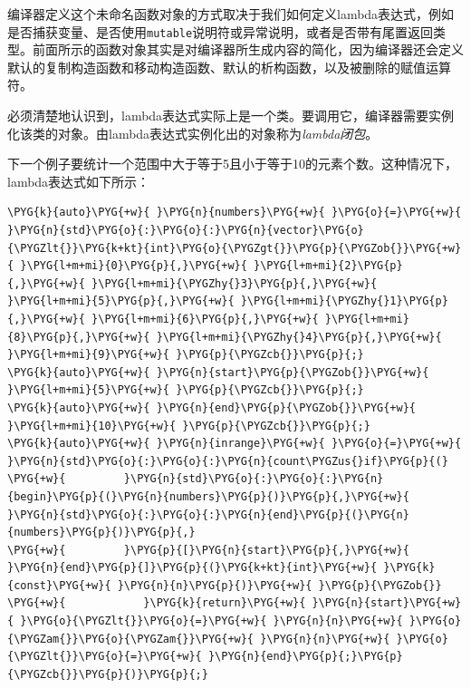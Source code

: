 
编译器定义这个未命名函数对象的方式取决于我们如何定义lambda表达式，例如是否捕获变量、是否使用\texttt{mutable}说明符或异常说明，或者是否带有尾置返回类型。前面所示的函数对象其实是对编译器所生成内容的简化，因为编译器还会定义默认的复制构造函数和移动构造函数、默认的析构函数，以及被删除的赋值运算符。



\begin{myNote}
必须清楚地认识到，lambda表达式实际上是一个类。要调用它，编译器需要实例化该类的对象。由lambda表达式实例化出的对象称为\textit{lambda闭包}。
\end{myNote}



下一个例子要统计一个范围中大于等于5且小于等于10的元素个数。这种情况下，lambda表达式如下所示：



\begin{codeblockbg}
\begin{Verbatim}[commandchars=\\\{\},breaklines=true,breakanywhere=true,fontsize=\codefont,xleftmargin=17bp]
\PYG{k}{auto}\PYG{+w}{ }\PYG{n}{numbers}\PYG{+w}{ }\PYG{o}{=}\PYG{+w}{ }\PYG{n}{std}\PYG{o}{:}\PYG{o}{:}\PYG{n}{vector}\PYG{o}{\PYGZlt{}}\PYG{k+kt}{int}\PYG{o}{\PYGZgt{}}\PYG{p}{\PYGZob{}}\PYG{+w}{ }\PYG{l+m+mi}{0}\PYG{p}{,}\PYG{+w}{ }\PYG{l+m+mi}{2}\PYG{p}{,}\PYG{+w}{ }\PYG{l+m+mi}{\PYGZhy{}3}\PYG{p}{,}\PYG{+w}{ }\PYG{l+m+mi}{5}\PYG{p}{,}\PYG{+w}{ }\PYG{l+m+mi}{\PYGZhy{}1}\PYG{p}{,}\PYG{+w}{ }\PYG{l+m+mi}{6}\PYG{p}{,}\PYG{+w}{ }\PYG{l+m+mi}{8}\PYG{p}{,}\PYG{+w}{ }\PYG{l+m+mi}{\PYGZhy{}4}\PYG{p}{,}\PYG{+w}{ }\PYG{l+m+mi}{9}\PYG{+w}{ }\PYG{p}{\PYGZcb{}}\PYG{p}{;}
\PYG{k}{auto}\PYG{+w}{ }\PYG{n}{start}\PYG{p}{\PYGZob{}}\PYG{+w}{ }\PYG{l+m+mi}{5}\PYG{+w}{ }\PYG{p}{\PYGZcb{}}\PYG{p}{;}
\PYG{k}{auto}\PYG{+w}{ }\PYG{n}{end}\PYG{p}{\PYGZob{}}\PYG{+w}{ }\PYG{l+m+mi}{10}\PYG{+w}{ }\PYG{p}{\PYGZcb{}}\PYG{p}{;}
\PYG{k}{auto}\PYG{+w}{ }\PYG{n}{inrange}\PYG{+w}{ }\PYG{o}{=}\PYG{+w}{ }\PYG{n}{std}\PYG{o}{:}\PYG{o}{:}\PYG{n}{count\PYGZus{}if}\PYG{p}{(}
\PYG{+w}{         }\PYG{n}{std}\PYG{o}{:}\PYG{o}{:}\PYG{n}{begin}\PYG{p}{(}\PYG{n}{numbers}\PYG{p}{)}\PYG{p}{,}\PYG{+w}{ }\PYG{n}{std}\PYG{o}{:}\PYG{o}{:}\PYG{n}{end}\PYG{p}{(}\PYG{n}{numbers}\PYG{p}{)}\PYG{p}{,}
\PYG{+w}{         }\PYG{p}{[}\PYG{n}{start}\PYG{p}{,}\PYG{+w}{ }\PYG{n}{end}\PYG{p}{]}\PYG{p}{(}\PYG{k+kt}{int}\PYG{+w}{ }\PYG{k}{const}\PYG{+w}{ }\PYG{n}{n}\PYG{p}{)}\PYG{+w}{ }\PYG{p}{\PYGZob{}}
\PYG{+w}{            }\PYG{k}{return}\PYG{+w}{ }\PYG{n}{start}\PYG{+w}{ }\PYG{o}{\PYGZlt{}}\PYG{o}{=}\PYG{+w}{ }\PYG{n}{n}\PYG{+w}{ }\PYG{o}{\PYGZam{}}\PYG{o}{\PYGZam{}}\PYG{+w}{ }\PYG{n}{n}\PYG{+w}{ }\PYG{o}{\PYGZlt{}}\PYG{o}{=}\PYG{+w}{ }\PYG{n}{end}\PYG{p}{;}\PYG{p}{\PYGZcb{}}\PYG{p}{)}\PYG{p}{;}
\end{Verbatim}
\end{codeblockbg}



